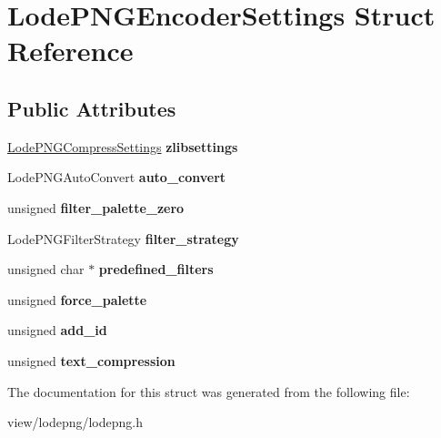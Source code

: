 \hypertarget{struct_lode_p_n_g_encoder_settings}{\section{Lode\-P\-N\-G\-Encoder\-Settings Struct Reference}
\label{struct_lode_p_n_g_encoder_settings}
}
\subsection*{Public Attributes}
\begin{DoxyCompactItemize}
\item 
\hypertarget{struct_lode_p_n_g_encoder_settings_a2c5928b4172c75e27de467870f2ff946}{\hyperlink{struct_lode_p_n_g_compress_settings}{Lode\-P\-N\-G\-Compress\-Settings} {\bfseries zlibsettings}}\label{struct_lode_p_n_g_encoder_settings_a2c5928b4172c75e27de467870f2ff946}

\item 
\hypertarget{struct_lode_p_n_g_encoder_settings_a4cad5feafb33c208706886bedb93d3d4}{Lode\-P\-N\-G\-Auto\-Convert {\bfseries auto\-\_\-convert}}\label{struct_lode_p_n_g_encoder_settings_a4cad5feafb33c208706886bedb93d3d4}

\item 
\hypertarget{struct_lode_p_n_g_encoder_settings_a0d82e8f2fabcb6cebbc54b80922945f1}{unsigned {\bfseries filter\-\_\-palette\-\_\-zero}}\label{struct_lode_p_n_g_encoder_settings_a0d82e8f2fabcb6cebbc54b80922945f1}

\item 
\hypertarget{struct_lode_p_n_g_encoder_settings_a5e18e4eb941763a2e3e6c65ee9f0729c}{Lode\-P\-N\-G\-Filter\-Strategy {\bfseries filter\-\_\-strategy}}\label{struct_lode_p_n_g_encoder_settings_a5e18e4eb941763a2e3e6c65ee9f0729c}

\item 
\hypertarget{struct_lode_p_n_g_encoder_settings_ad70b06025a5138e5ca02d0035ecccb28}{unsigned char $\ast$ {\bfseries predefined\-\_\-filters}}\label{struct_lode_p_n_g_encoder_settings_ad70b06025a5138e5ca02d0035ecccb28}

\item 
\hypertarget{struct_lode_p_n_g_encoder_settings_a04dc9622ccd1d7c74c56291409aa512a}{unsigned {\bfseries force\-\_\-palette}}\label{struct_lode_p_n_g_encoder_settings_a04dc9622ccd1d7c74c56291409aa512a}

\item 
\hypertarget{struct_lode_p_n_g_encoder_settings_a893aa542aa7c122c32ee36dd716fbcb2}{unsigned {\bfseries add\-\_\-id}}\label{struct_lode_p_n_g_encoder_settings_a893aa542aa7c122c32ee36dd716fbcb2}

\item 
\hypertarget{struct_lode_p_n_g_encoder_settings_a6ffdcb8e85a65ea208fe027be072d710}{unsigned {\bfseries text\-\_\-compression}}\label{struct_lode_p_n_g_encoder_settings_a6ffdcb8e85a65ea208fe027be072d710}

\end{DoxyCompactItemize}


The documentation for this struct was generated from the following file\-:\begin{DoxyCompactItemize}
\item 
view/lodepng/lodepng.\-h\end{DoxyCompactItemize}

